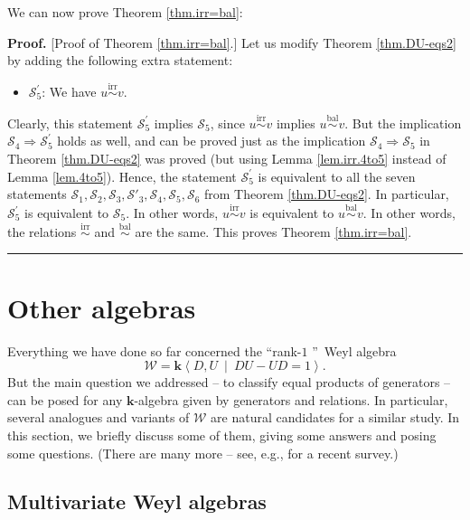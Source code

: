 \documentclass[numbers=enddot,12pt,final,onecolumn,notitlepage]{scrartcl}%
\theoremstyle{definition}
\newenvironment{proof}[1][Proof]{\noindent\textbf{#1.} }{\ \rule{0.5em}{0.5em}}
\newcommand{\W}{\mathcal{W}}
\newcommand{\kk}{\mathbf{k}}
\newcommand{\balsim}{\overset{\operatorname*{bal}}{\sim}}
\newcommand{\irrsim}{\overset{\operatorname*{irr}}{\sim}}
\begin{document}
We can now prove Theorem \ref{thm.irr=bal}:

\begin{proof}
[Proof of Theorem \ref{thm.irr=bal}.] Let us modify Theorem \ref{thm.DU-eqs2}
by adding the following extra statement:

\begin{itemize}
\item $\mathcal{S}_{5}^{\prime}$: We have $u\irrsim v$.
\end{itemize}

Clearly, this statement $\mathcal{S}_{5}^{\prime}$ implies $\mathcal{S}_{5}$,
since $u\irrsim v$ implies $u\balsim v$. But the implication $\mathcal{S}%
_{4}\Longrightarrow\mathcal{S}_{5}^{\prime}$ holds as well, and can be proved
just as the implication $\mathcal{S}_{4}\Longrightarrow\mathcal{S}_{5}$ in
Theorem \ref{thm.DU-eqs2} was proved (but using Lemma \ref{lem.irr.4to5} instead of
Lemma \ref{lem.4to5}). Hence, the statement $\mathcal{S}_{5}^{\prime}$ is
equivalent to all the seven statements
$\mathcal{S}_{1},\mathcal{S}_{2},\mathcal{S}_{3},\mathcal{S}'_3,\mathcal{S}_{4},\mathcal{S}_{5}, \mathcal{S}_6$
from Theorem \ref{thm.DU-eqs2}.
In
particular, $\mathcal{S}_{5}^{\prime}$ is equivalent to $\mathcal{S}_{5}$. In
other words, $u\irrsim v$ is equivalent to $u\balsim v$. In other words, the
relations $\irrsim$ and $\balsim$ are the same. This proves Theorem
\ref{thm.irr=bal}.
\end{proof}


\section{Other algebras}\label{sec:otheralg}

Everything we have done so far concerned the \textquotedblleft rank-$1$%
\textquotedblright\ Weyl algebra
\[
\W=\kk\left\langle
D,U\ \mid\ DU-UD=1\right\rangle.
\]
But the main question we addressed -- to
classify equal products of generators -- can be posed for any $\kk%
$-algebra given by generators and relations. In particular, several analogues
and variants of $\W$ are natural candidates for a
similar study. In this section, we briefly discuss some of them, giving some
answers and posing some questions.
(There are many more -- see, e.g., \cite{Gaddis23} for a recent survey.)

\subsection{Multivariate Weyl algebras}
\end{document}
